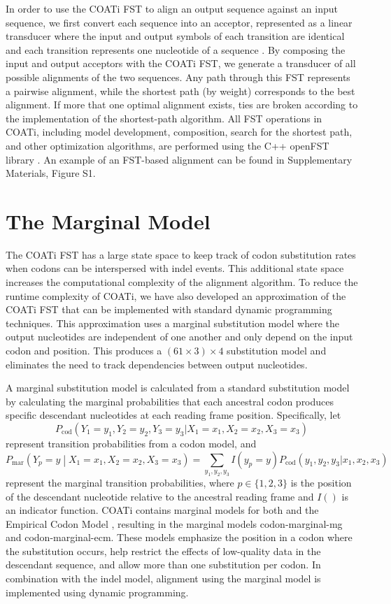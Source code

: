 \documentclass[12pt,letterpaper]{article}
\begin{document}
In order to use the COATi FST to align an output sequence against an input sequence, we first convert each sequence into an acceptor, represented as a linear transducer where the input and output symbols of each transition are identical and each transition represents one nucleotide of a sequence \citep{allauzen2007openfst}. By composing the input and output acceptors with the COATi FST, we generate a transducer of all possible alignments of the two sequences. Any path through this FST represents a pairwise alignment, while the shortest path (by weight) corresponds to the best alignment. If more that one optimal alignment exists, ties are broken according to the implementation of the shortest-path algorithm. All FST operations in COATi, including model development, composition, search for the shortest path, and other optimization algorithms, are performed using the C++ openFST library \citep{allauzen2007openfst}. An example of an FST-based alignment can be found in Supplementary Materials, Figure S1.

\section*{The Marginal Model}

The COATi FST has a large state space to keep track of codon substitution rates when codons can be interspersed with indel events. This additional state space increases the computational complexity of the alignment algorithm. To reduce the runtime complexity of COATi, we have also developed an approximation of the COATi FST that can be implemented with standard dynamic programming techniques. This approximation uses a marginal substitution model where the output nucleotides are independent of one another and only depend on the input codon and position. This produces a $\left(61 \times 3 \right) \times 4$ substitution model and eliminates the need to track dependencies between output nucleotides.

A marginal substitution model is calculated from a standard substitution model by calculating the marginal probabilities that each ancestral codon produces specific descendant nucleotides at each reading frame position. Specifically, let
%
\[
P_\text{cod}\left( Y_1 = y_1, Y_2 = y_2, Y_3 = y_3 |
                   X_1 = x_1, X_2 = x_2, X_3 = x_3 \right)
\]
%
represent transition probabilities from a codon model, and
%
\[
P_\text{mar}\left(Y_p = y \middle| X_1 = x_1, X_2 = x_2, X_3 = x_3 \right)
=
\sum_{y_1, y_2, y_3} I(y_p = y)
P_\text{cod}\left( y_1, y_2, y_3 |
                   x_1, x_2, x_3 \right)
\]
%
represent the marginal transition probabilities, where $p \in \{1, 2, 3\}$ is the position of the descendant nucleotide relative to the ancestral reading frame and $I()$ is an indicator function. COATi contains marginal models for both \cite{muse_gaut_1994} and the Empirical Codon Model \citep{kosiol_ECM_2007}, resulting in the marginal models codon-marginal-mg and codon-marginal-ecm. These models emphasize the position in a codon where the substitution occurs, help restrict the effects of low-quality data in the descendant sequence, and allow more than one substitution per codon. In combination with the indel model, alignment using the marginal model is implemented using dynamic programming.
\end{document}
